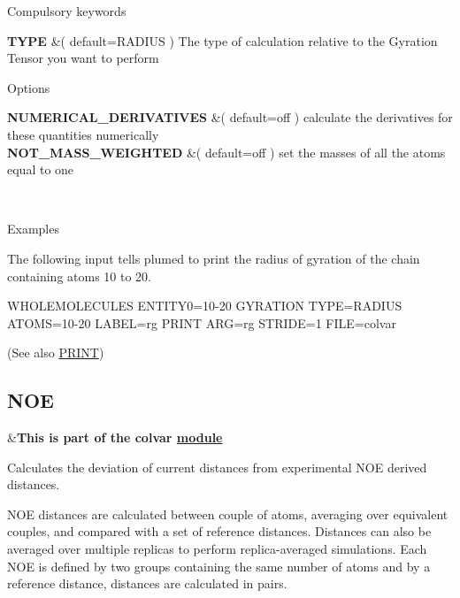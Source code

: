 \begin{DoxyParagraph}{Compulsory keywords}

\end{DoxyParagraph}
\begin{TabularC}{2}
\hline
{\bfseries  T\+Y\+P\+E } &( default=R\+A\+D\+I\+U\+S ) The type of calculation relative to the Gyration Tensor you want to perform   \\
\end{TabularC}


\begin{DoxyParagraph}{Options}

\end{DoxyParagraph}
\begin{TabularC}{2}
\hline
{\bfseries  N\+U\+M\+E\+R\+I\+C\+A\+L\+\_\+\+D\+E\+R\+I\+V\+A\+T\+I\+V\+E\+S } &( default=off ) calculate the derivatives for these quantities numerically   \\
{\bfseries  N\+O\+T\+\_\+\+M\+A\+S\+S\+\_\+\+W\+E\+I\+G\+H\+T\+E\+D } &( default=off ) set the masses of all the atoms equal to one  

\\
\end{TabularC}


\begin{DoxyParagraph}{Examples}

\end{DoxyParagraph}
The following input tells plumed to print the radius of gyration of the chain containing atoms 10 to 20. \begin{DoxyVerb}WHOLEMOLECULES ENTITY0=10-20
GYRATION TYPE=RADIUS ATOMS=10-20 LABEL=rg
PRINT ARG=rg STRIDE=1 FILE=colvar 
\end{DoxyVerb}
 (See also \hyperlink{PRINT}{P\+R\+I\+N\+T}) \hypertarget{NOE}{}\subsection{N\+O\+E}\label{NOE}
\begin{TabularC}{2}
\hline
&{\bfseries  This is part of the colvar \hyperlink{mymodules}{module }}   \\
\end{TabularC}
Calculates the deviation of current distances from experimental N\+O\+E derived distances.

N\+O\+E distances are calculated between couple of atoms, averaging over equivalent couples, and compared with a set of reference distances. Distances can also be averaged over multiple replicas to perform replica-\/averaged simulations. Each N\+O\+E is defined by two groups containing the same number of atoms and by a reference distance, distances are calculated in pairs.

